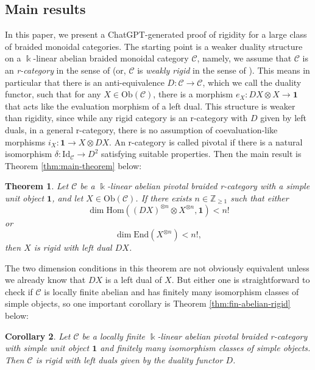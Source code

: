 \documentclass[11pt, reqno]{amsart}
\newtheorem{thm}{Theorem}[section]
\newtheorem{cor}[thm]{Corollary}
\theoremstyle{definition}\newtheorem{defi}[thm]{Definition}
\theoremstyle{definition}\newtheorem{rem}[thm]{Remark}
\theoremstyle{definition}\newtheorem{exam}[thm]{Example}
\theoremstyle{definition}\newtheorem{assum}[thm]{Assumption}
\newcommand{\cC}{\mathcal{C}}
\newcommand{\ZZ}{\mathbb{Z}}
\newcommand{\Id}{\mathrm{Id}}
\newcommand{\vac}{\mathbf{1}}
\begin{document}
\subsection{Main results}

In this paper, we present a ChatGPT-generated proof of rigidity for a large class of braided monoidal categories. The starting point is a weaker duality structure on a $\Bbbk$-linear abelian braided monoidal category $\cC$, namely, we assume that $\cC$ is an \textit{r-category} in the sense of \cite{BD} (or, $\cC$ is \textit{weakly rigid} in the sense of \cite[Definition A.4]{KL4}). This means in particular that there is an anti-equivalence $D:\cC\rightarrow\cC$, which we call the duality functor, such that for any $X\in\mathrm{Ob}(\cC)$, there is a morphism $e_X: DX\otimes X\rightarrow\vac$ that acts like the evaluation morphism of a left dual. This structure is weaker than rigidity, since while any rigid category is an r-category with $D$ given by left duals, in a general r-category, there is no assumption of coevaluation-like morphisms $i_X: \vac\rightarrow X\otimes DX$. An r-category is called pivotal if there is a natural isomorphism $\delta:\Id_\cC\rightarrow D^2$ satisfying suitable properties. Then the main result is Theorem \ref{thm:main-theorem} below:

\begin{thm}\label{thm:intro-main-theorem}
Let $\cC$ be a $\Bbbk$-linear abelian pivotal braided r-category with a simple unit object $\vac$, and let $X\in\mathrm{Ob}(\cC)$. If there exists $n\in\ZZ_{\geq 1}$ such that either
\begin{equation*}
\dim\mathrm{Hom}((DX)^{\otimes n}\otimes X^{\otimes n},\vac)<n!
\end{equation*}
or
\begin{equation*}
\dim\mathrm{End}(X^{\otimes n})<n!,
\end{equation*}
then $X$ is rigid with left dual $DX$.
\end{thm}

The two dimension conditions in this theorem are not obviously equivalent unless we already know that $DX$ is a left dual of $X$. But either one is straightforward to check if $\cC$ is locally finite abelian and has finitely many isomorphism classes of simple objects, so one important corollary is Theorem \ref{thm:fin-abelian-rigid} below:
\begin{cor}\label{cor:intro-finite}
Let $\cC$ be a locally finite $\Bbbk$-linear abelian pivotal braided r-category with simple unit object $\vac$ and finitely many isomorphism classes of simple objects. Then $\cC$ is rigid with left duals given by the duality functor $D$.
\end{cor}
\end{document}
